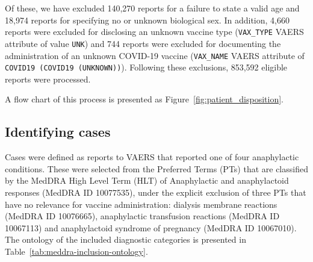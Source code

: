 \documentclass{article}
\begin{document}
Of these, we have excluded 140,270 reports for a failure to state a valid age and 18,974 reports for specifying no or unknown biological sex.
In addition, 4,660 reports were excluded for disclosing an unknown vaccine type (\texttt{VAX\_TYPE} VAERS attribute of value \texttt{UNK}) and 744 reports were excluded for documenting the administration of an unknown COVID-19 vaccine (\texttt{VAX\_NAME} VAERS attribute of \texttt{COVID19 (COVID19 (UNKNOWN))}).
Following these exclusions, 853,592 eligible reports were processed.

A flow chart of this process is presented as Figure~\ref{fig:patient_disposition}.

\subsection{Identifying cases}\label{subsec:identifying-cases}

Cases were defined as reports to VAERS that reported one of four anaphylactic conditions.
These were selected from the Preferred Terms (PTs) that are classified by the MedDRA High Level Term (HLT) of Anaphylactic and anaphylactoid responses (MedDRA ID 10077535), under the explicit exclusion of three PTs that have no relevance for vaccine administration: dialysis membrane reactions (MedDRA ID 10076665), anaphylactic transfusion reactions (MedDRA ID 10067113) and anaphylactoid syndrome of pregnancy (MedDRA ID 10067010).
The ontology of the included diagnostic categories is presented in Table~\ref{tab:meddra-inclusion-ontology}.
\end{document}
